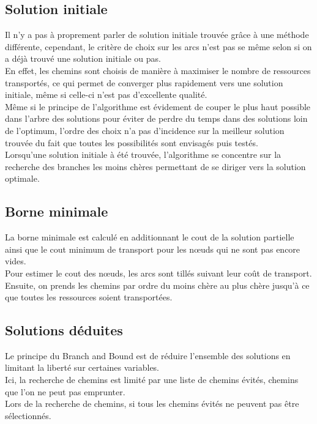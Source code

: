 \documentclass[a4paper, 12pt]{report}
\begin{document}
\subsection{Solution initiale}
Il n'y a pas à proprement parler de solution initiale trouvée grâce à une méthode différente, cependant, le critère de choix sur les arcs n'est pas se même selon si on a déjà trouvé une solution initiale ou pas.\\
En effet, les chemins sont choisis de manière à maximiser le nombre de ressources transportés, 
ce qui permet de converger plus rapidement vers une solution initiale, même si celle-ci n'est pas d'excellente qualité.\\

Même si le principe de l'algorithme est évidement de couper le plus haut possible dans l'arbre des solutions 
pour éviter de perdre du temps dans des solutions loin de l'optimum, 
l'ordre des choix n'a pas d'incidence sur la meilleur solution trouvée 
du fait que toutes les possibilités sont envisagés puis testés.\\

Lorsqu'une solution initiale à été trouvée, l'algorithme se concentre sur la recherche des branches les moins chères
permettant de se diriger vers la solution optimale.

\subsection{Borne minimale}
La borne minimale est calculé en additionnant le cout de la solution partielle ainsi que le cout minimum de transport pour les nœuds qui ne sont pas encore vides. \\
Pour estimer le cout des nœuds, les arcs sont tillés suivant leur coût de transport. 
Ensuite, on prends les chemins par ordre du moins chère au plus chère
jusqu'à ce que toutes les ressources soient transportées. 

\subsection{Solutions déduites}
Le principe du Branch and Bound est de réduire l'ensemble des solutions en limitant la liberté sur certaines variables. \\
Ici, la recherche de chemins est limité par une liste de chemins évités, chemins que l'on ne peut pas emprunter.\\
Lors de la recherche de chemins, si tous les chemins évités ne  peuvent pas être sélectionnés. 
\end{document}
